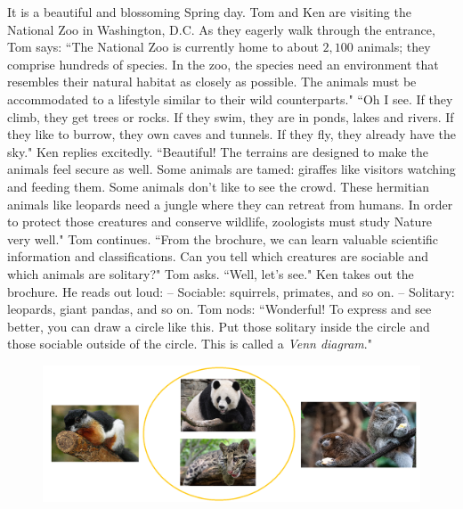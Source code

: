 \begin{multicols}{2}
	It is a beautiful and blossoming Spring day. Tom and Ken are visiting the National Zoo in Washington, D.C. 
	\vskip 0.1cm
	As they eagerly walk through the entrance, Tom says: ``The National Zoo is currently home to about $2{,}100$ animals; they comprise hundreds of species. In the zoo, the species need an environment that resembles their natural habitat as closely as possible. The animals must be accommodated to a lifestyle similar to their wild counterparts."
	\vskip 0.1cm
	``Oh I see. If they climb, they get trees or rocks. If they swim, they are in ponds, lakes and rivers. If they like to burrow, they own caves and tunnels. If they fly, they already have the sky." Ken replies excitedly.
	\vskip 0.1cm
	``Beautiful! The terrains are designed to make the animals feel secure as well. Some animals are tamed: giraffes like visitors watching and feeding them. Some animals don't like to see the crowd. These hermitian animals like leopards need a jungle where they can retreat from humans. In order to protect those creatures and conserve wildlife, zoologists must study Nature very well." Tom continues.
	\vskip 0.1cm
	``From the brochure, we can learn valuable scientific information and classifications. Can you tell which creatures are sociable and which animals are solitary?" Tom asks.
	\vskip 0.1cm
	``Well, let's see." Ken takes out the brochure. He reads out loud:
	\vskip 0.1cm
	--	Sociable: squirrels, primates, and so on.
	\vskip 0.1cm
	--	Solitary: leopards, giant pandas, and so on. 
	\vskip 0.1cm
	Tom nods: ``Wonderful! To express and see better, you can draw a circle like this. Put those solitary inside the circle and those sociable outside of the circle. This is called a \textit{Venn diagram}."
	\begin{figure}[H]
		\vspace*{-10pt}
		\centering
		\captionsetup{labelformat= empty, justification=centering}
		\includegraphics[width= 1\linewidth]{p1}
		\vspace*{-15pt}
	\end{figure}	

\end{multicols}
